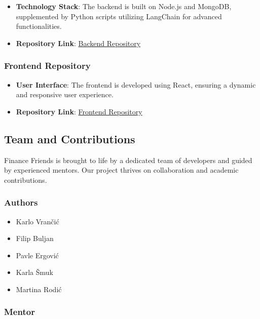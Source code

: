 \begin{itemize}
\tightlist
\item
  \textbf{Technology Stack}: The backend is built on Node.js and
  MongoDB, supplemented by Python scripts utilizing LangChain for
  advanced functionalities.
\item
  \textbf{Repository Link}:
  \href{https://github.com/FinanceFriend/backend}{Backend Repository}
\end{itemize}

\hypertarget{frontend-repository}{%
\subsubsection{Frontend Repository}\label{frontend-repository}}

\begin{itemize}
\tightlist
\item
  \textbf{User Interface}: The frontend is developed using React,
  ensuring a dynamic and responsive user experience.
\item
  \textbf{Repository Link}:
  \href{https://github.com/FinanceFriend/frontend}{Frontend Repository}
\end{itemize}

\hypertarget{team-and-contributions}{%
\subsection{Team and Contributions}\label{team-and-contributions}}

Finance Friends is brought to life by a dedicated team of developers and
guided by experienced mentors. Our project thrives on collaboration and
academic contributions.

\hypertarget{authors}{%
\subsubsection{Authors}\label{authors}}

\begin{itemize}
\tightlist
\item
  Karlo Vrančić
\item
  Filip Buljan
\item
  Pavle Ergović
\item
  Karla Šmuk
\item
  Martina Rodić
\end{itemize}

\hypertarget{mentor}{%
\subsubsection{Mentor}\label{mentor}}

